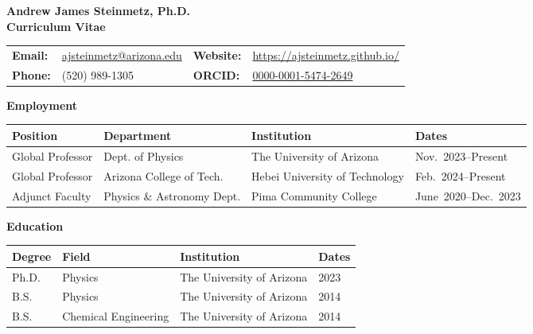 \documentclass[11pt]{article}
\begin{document}
\begin{center}
    {\Large\textbf{Andrew James Steinmetz, Ph.D.}}\\[0.5em]
    {\large\textbf{Curriculum Vitae}}
\end{center}

{\normalsize
\begin{center}
    \begin{tabular}{@{}p{2.0cm} p{5.0cm} p{2.0cm} p{5.0cm}@{}}
        \textbf{Email:} & \href{mailto:ajsteinmetz@arizona.edu}{ajsteinmetz@arizona.edu} &
        \textbf{Website:} & \href{https://ajsteinmetz.github.io/}{https://ajsteinmetz.github.io/} \\
        \textbf{Phone:} & (520) 989-1305 &
        \textbf{ORCID:} & \href{https://orcid.org/0000-0001-5474-2649}{0000-0001-5474-2649} \\
    \end{tabular}
\end{center}
}

\medskip

{\Large\textbf{Employment}}

{\normalsize
\begin{tabular}{@{}p{2.8cm} p{5.0cm} p{5.5cm} p{3.2cm}@{}}
    \toprule
    \textbf{Position} & \textbf{Department} & \textbf{Institution} & \textbf{Dates} \\
    \midrule
    Global Professor & Dept. of Physics & The University of Arizona              & {\footnotesize Nov.~2023--Present} \\
    Global Professor & Arizona College of Tech. & Hebei University of Technology & {\footnotesize Feb.~2024--Present} \\
    Adjunct Faculty  & Physics \& Astronomy Dept. & Pima Community College       & {\footnotesize June~2020--Dec.~2023} \\
    \bottomrule
\end{tabular}
}

\medskip

{\Large\textbf{Education}}

{\normalsize
\begin{tabular}{@{}p{2.8cm} p{5.0cm} p{5.5cm} p{3.2cm}@{}}
    \toprule
    \textbf{Degree} & \textbf{Field} & \textbf{Institution} & \textbf{Dates} \\
    \midrule
    Ph.D. & Physics             & The University of Arizona & 2023 \\
    B.S.   & Physics             & The University of Arizona & 2014 \\
    B.S.   & Chemical Engineering& The University of Arizona & 2014 \\
    \bottomrule
\end{tabular}
}
\end{document}
